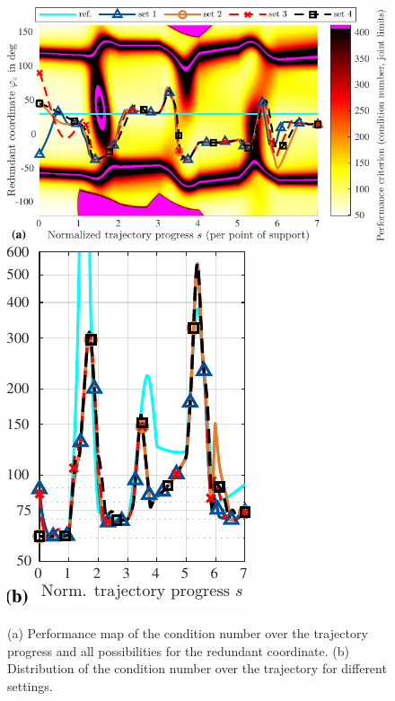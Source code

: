 \documentclass[a4paper,twoside]{article}
\begin{document}
\begin{figure}[tb]
	\includegraphics{nullspace_traj.pdf}
	\includegraphics{nullspace_traj_condition.pdf}
	\caption{(a) Performance map of the condition number over the trajectory progress and all possibilities for the redundant coordinate. (b) Distribution of the condition number over the trajectory for different settings.}
	\label{fig:pkm_trajectory_results}
\end{figure}
\end{document}

